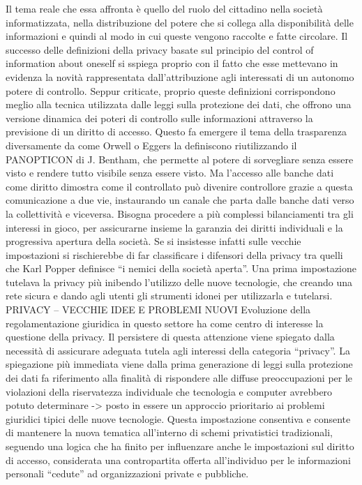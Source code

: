 Il tema reale che essa affronta è quello del ruolo del cittadino nella società informatizzata, nella distribuzione del potere che si collega alla disponibilità delle informazioni e quindi al modo in cui queste vengono raccolte e fatte circolare.
Il successo delle definizioni della privacy basate sul principio del control of information about oneself si sspiega proprio con il fatto che esse mettevano in evidenza la novità rappresentata dall’attribuzione agli interessati di un autonomo potere di controllo. Seppur criticate, proprio queste definizioni corrispondono meglio alla tecnica utilizzata dalle leggi sulla protezione dei dati, che offrono una versione dinamica dei poteri di controllo sulle informazioni attraverso la previsione di un diritto di accesso. Questo fa emergere il tema della trasparenza diversamente da come Orwell o Eggers la definiscono riutilizzando il PANOPTICON di J. Bentham, che permette al potere di sorvegliare senza essere visto e rendere tutto visibile senza essere visto. Ma l’accesso alle banche dati come diritto dimostra come il controllato può divenire controllore grazie a questa comunicazione a due vie, instaurando un canale che parta dalle banche dati verso la collettività e viceversa.
Bisogna procedere a più complessi bilanciamenti tra gli interessi in gioco, per assicurarne insieme la garanzia dei diritti individuali e la progressiva apertura della società. Se si insistesse infatti sulle vecchie impostazioni si rischierebbe di far classificare i difensori della privacy tra quelli che Karl Popper definisce “i nemici della società aperta”.
Una prima impostazione tutelava la privacy più inibendo l’utilizzo delle nuove tecnologie, che creando una rete sicura e dando agli utenti gli strumenti idonei per utilizzarla e tutelarsi.
PRIVACY – VECCHIE IDEE E PROBLEMI NUOVI
Evoluzione della regolamentazione giuridica in questo settore ha come centro di interesse la questione della privacy. Il persistere di questa attenzione viene spiegato dalla necessità di assicurare adeguata tutela agli interessi della categoria “privacy”. La spiegazione più immediata viene dalla prima generazione di leggi sulla protezione dei dati fa riferimento alla finalità di rispondere alle diffuse preoccupazioni per le violazioni della riservatezza individuale che tecnologia e computer avrebbero potuto determinare -> posto in essere un approccio prioritario ai problemi giuridici tipici delle nuove tecnologie.
Questa impostazione consentiva e consente di mantenere la nuova tematica all’interno di schemi privatistici tradizionali, seguendo una logica che ha finito per influenzare anche le impostazioni sul diritto di accesso, considerata una contropartita offerta all’individuo per le informazioni personali “cedute” ad organizzazioni private e pubbliche. 
